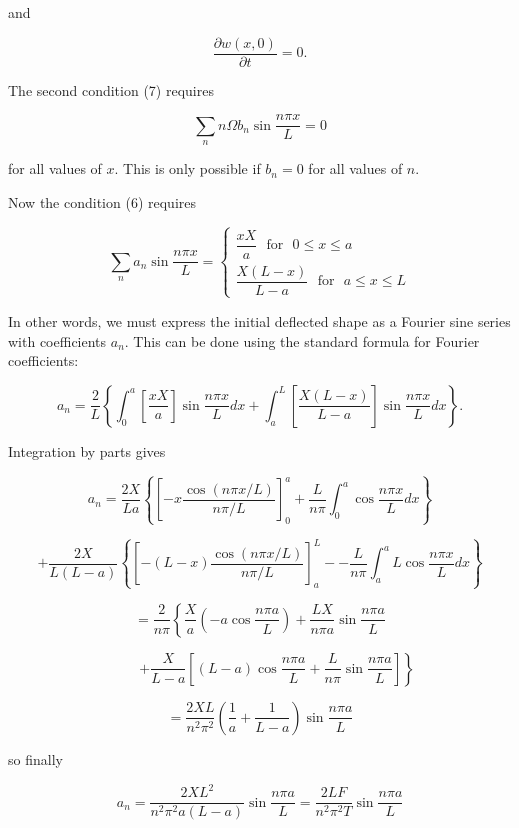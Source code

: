   and 

  $$\dfrac{\partial w(x,0)}{\partial t}=0 . \tag{7}$$ 

  The second condition (7) requires 

  $$\sum_n{n \Omega b_n \sin\dfrac{n \pi x}{L}}=0 \tag{8}$$ 

  for all values of $x$. This is only possible if $b_n=0$ for all values of 
  $n$. 

  Now the condition (6) requires 

  $$ \sum_n{a_n \sin \dfrac{n \pi x}{L}} = \left\{ \begin{array}{ll} 
  \dfrac{xX}{a} \mathrm{~~~for~~~} 0\le x\le a \\ \dfrac{X(L-x)}{L-a} 
  \mathrm{~~~for~~~} a\le x\le L \end{array} \right. \tag{9}$$ 

  In other words, we must express the initial deflected shape as a Fourier sine 
  series with coefficients $a_n$. This can be done using the standard formula 
  for Fourier coefficients: 

  $$a_n= \dfrac{2}{L} \left\lbrace \int_0^a{ \left[ \dfrac{xX}{a} \right] \sin 
  \dfrac{n \pi x}{L} dx } + \int_a^L{\left[ \dfrac{X(L-x)}{L-a} \right] \sin 
  \dfrac{n \pi x}{L} dx } \right\rbrace . \tag{10}$$ 

  Integration by parts gives 

  $$a_n=\dfrac{2X}{La} \left\lbrace \left[ -x \dfrac{\cos (n \pi x/L)}{n \pi/L} 
  \right] _0^a + \dfrac{L}{n \pi} \int_0^a{\cos \dfrac{n \pi x}{L} 
  dx}\right\rbrace $$ 

  $$+\dfrac{2X}{L(L-a)} \left\lbrace \left[ -(L-x) \dfrac{\cos (n \pi x/L)}{n 
  \pi/L} \right]_a^L -- \dfrac{L}{n \pi} \int_a^aL{\cos \dfrac{n \pi x}{L} 
  dx}\right\rbrace $$ 

  $$ = \dfrac{2}{n \pi}\left\lbrace \dfrac{X}{a}\left( -a \cos \dfrac{n \pi 
  a}{L}\right) +\dfrac{LX}{n \pi a}\sin \dfrac{n \pi a}{L} \right. $$ 

  $$\mathrm{~~~~~~~~~~~}\left. +\dfrac{X}{L-a}\left[ (L-a) \cos \dfrac{n \pi 
  a}{L} +\dfrac{L}{n \pi}\sin \dfrac{n \pi a}{L}\right] \right\rbrace $$ 

  $$= \dfrac{2XL}{n^2 \pi^2} \left( \dfrac{1}{a}+\dfrac{1}{L-a}\right) \sin 
  \dfrac{n \pi a}{L}$$ 

  so finally 

  $$a_n= \dfrac{2XL^2}{n^2 \pi^2 a(L-a)} \sin \dfrac{n \pi a}{L}= 
  \dfrac{2LF}{n^2 \pi^2 T} \sin \dfrac{n \pi a}{L} \tag{11}$$ 

